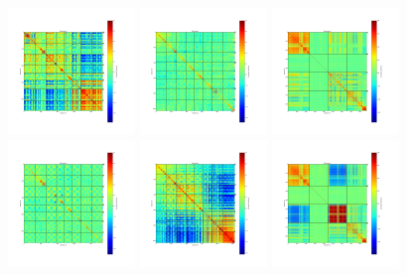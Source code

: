 \begin{figure}[ht]
\begin{center}
\includegraphics[width=0.3\textwidth]{Figures/DarkTests/corrmat_TOI_CM_array_3_20160313s87.pdf}
\includegraphics[width=0.3\textwidth]{Figures/DarkTests/corrmat_TOI_PCA_array_1_20160313s87.pdf}
\includegraphics[width=0.3\textwidth]{Figures/DarkTests/corrmat_TOI_PCA_array_2_20160313s87.pdf}
\includegraphics[width=0.3\textwidth]{Figures/DarkTests/corrmat_TOI_PCA_array_3_20160313s87.pdf}
\includegraphics[width=0.3\textwidth]{Figures/DarkTests/corrmat_TOI_BC_array_1_20160313s87.pdf}
\includegraphics[width=0.3\textwidth]{Figures/DarkTests/corrmat_TOI_BC_array_2_20160313s87.pdf}

\end{center}
\end{figure}
